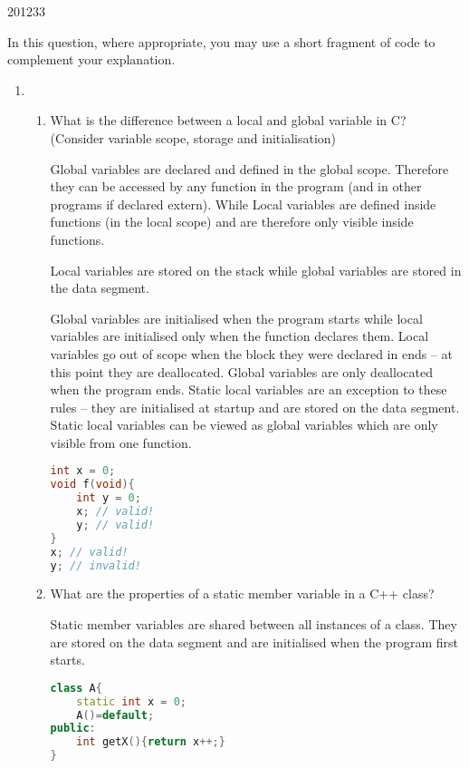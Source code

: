 \documentclass[10pt,\jkfside,a4paper]{article}
\begin{document}
\begin{examquestion}{2012}{3}{3}

In this question, where appropriate, you may use a short fragment of code to
complement your explanation.

\begin{enumerate}[label=(\alph*)]

\item

\begin{enumerate}[label=(\roman*)]

\item What is the difference between a local and global variable in C?
(Consider variable scope, storage and initialisation)

Global variables are declared and defined in the global scope. Therefore they
can be accessed by any function in the program (and in other programs if
declared extern). While Local variables are defined inside functions (in the
local scope) and are therefore only visible inside functions.

Local variables are stored on the stack while global variables are stored in
the data segment.

Global variables are initialised when the program starts while local
variables are initialised only when the function declares them. Local
variables go out of scope when the block they were declared in ends -- at
this point they are deallocated. Global variables are only deallocated when
the program ends. Static local variables are an exception to these rules --
they are initialised at startup and are stored on the data segment. Static
local variables can be viewed as global variables which are only visible
from one function.

\begin{lstlisting}[language=C]
int x = 0;
void f(void){
	int y = 0;
	x; // valid!
	y; // valid!
}
x; // valid!
y; // invalid!
\end{lstlisting}

\item What are the properties of a static member variable in a C++ class?

Static member variables are shared between all instances of a class. They
are stored on the data segment and are initialised when the program
first starts.

\begin{lstlisting}[language=C++]
class A{
	static int x = 0;
	A()=default;
public:
	int getX(){return x++;}
}


\end{lstlisting}
\end{enumerate}
\end{enumerate}
\end{examquestion}
\end{document}

